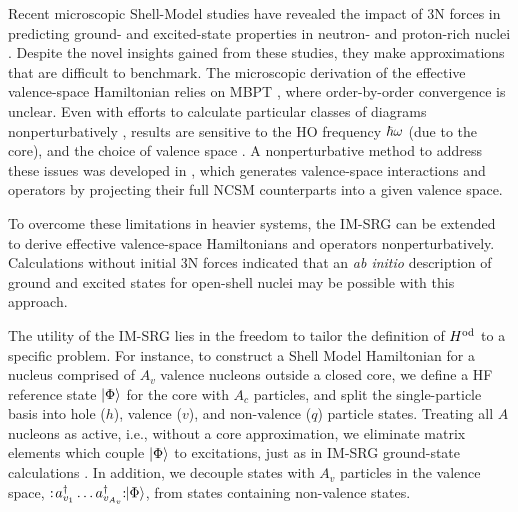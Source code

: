 Recent microscopic Shell-Model studies have revealed the impact of 3N
forces in predicting ground- and excited-state properties in neutron-
and proton-rich nuclei
\cite{Otsuka:2010cr,Holt:2012fk,Holt:2013fk,Holt:2013hc,Holt:2013cr,Gallant:2012kx,Wienholtz:2013bh,Holt:2014vn}.
Despite the novel insights gained from these studies, they make
approximations that are difficult to benchmark. The microscopic
derivation of the effective valence-space Hamiltonian relies on MBPT
\cite{Hjorth-Jensen:1995ys}, where order-by-order convergence is unclear. Even with
efforts to calculate particular classes of diagrams nonperturbatively
\cite{Holt:2005mi}, results are sensitive to the HO frequency $\hbar\omega$ (due
to the core), and the choice of valence space
\cite{Holt:2012fk,Holt:2013fk,Holt:2013hc}. A nonperturbative method to
address these issues was developed in
\cite{Lisetskiy:2008fk,Lisetskiy:2009uq,Dikmen:2015fk}, which generates valence-space
interactions and operators by projecting their full NCSM counterparts
into a given valence space.

To overcome these limitations in heavier systems, the IM-SRG can be
extended to derive effective valence-space Hamiltonians and operators
nonperturbatively.  Calculations without initial 3N forces
\cite{Tsukiyama:2012fk} indicated that an \emph{ab initio} description
of ground and excited states for open-shell nuclei may be possible
with this approach.

The utility of the IM-SRG lies in the freedom to tailor the definition
of $H^{\rm{od}}$ to a specific problem.  For instance, to construct a
Shell Model Hamiltonian for a nucleus comprised of $A_v$ valence
nucleons outside a closed core, we define a HF reference state
$\ket{\Phi}$ for the core with $A_c$ particles, and split the
single-particle basis into hole ($h$), valence ($v$), and non-valence
($q$) particle states.  Treating all $A$ nucleons as active, i.e.,
without a core approximation, we eliminate matrix elements which
couple $\ket{\Phi}$ to excitations, just as in IM-SRG ground-state
calculations \cite{Tsukiyama:2011uq,Hergert:2013mi,Hergert:2013ij}. In
addition, we decouple states with $A_v$ particles in the valence
space, \mbox{$:\!a^\dag_{v_1}\ldots a^\dag_{v_{A_v}}\!\!:\!\!\ket{\Phi}$},
from states containing non-valence states.

